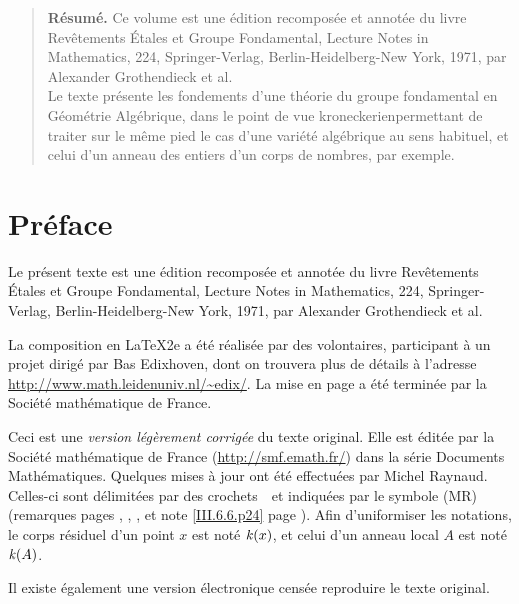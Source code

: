




\begin{quote}\textbf{Résumé.} 
Ce volume est une \'edition recompos\'ee et annot\'ee du livre \og Rev\^etements \'Etales et Groupe Fondamental\fg, Lecture Notes in Mathematics, 224, Springer-Verlag, Berlin-Heidelberg-New York, 1971, par Alexander Grothendieck et al.\\
Le texte pr\'esente les fondements d'une th\'eorie du groupe fondamental en G\'eom\'etrie Alg\'ebrique, dans le point de vue \og kroneckerien\fg permettant de traiter sur le m\^eme pied le cas d'une vari\'et\'e alg\'ebrique au sens habituel, et celui d'un anneau des entiers d'un corps de nombres, par exemple.
\end{quote}













\cleardoublepage
\renewcommand{\baselinestretch}{1.05}\normalfont
\chapter*{Pr\'eface}
\thispagestyle{empty}
\vfill
Le pr\'esent texte est une \'edition recompos\'ee
et annot\'ee
du livre \og Rev\^etements
\'Etales et Groupe Fondamental\fg, Lecture Notes in Mathematics, 224,
Springer-Verlag, Berlin-Heidelberg-New York, 1971, par Alexander
Grothendieck et al.

La composition en \LaTeX 2e a \'et\'e r\'ealis\'ee par des volontaires, participant \`a un projet dirig\'e par Bas Edixhoven, dont on trouvera plus de d\'etails \`a l'adresse \url{http://www.math.leidenuniv.nl/~edix/}. La mise en page a \'et\'e termin\'ee par la \hbox{Société} math\'ematique de France.

Ceci est une \emph{version légèrement corrigée} du texte
original. Elle est \'edit\'ee par la \hbox{Société} math\'ematique de France (\url{http://smf.emath.fr/}) dans la s\'erie \og Documents \hbox{Mathématiques}\fg. Quelques mises \`a jour ont \'et\'e effectu\'ees par Michel Raynaud. Celles-ci sont d\'elimit\'ees par des crochets \lcrochetbf\,\rcrochetbf\ et indiqu\'ees par le symbole (MR) (remarques pages \pageref{X.2.14}, \pageref{XI.1.4}, \pageref{XII.5.6}, \pageref{XIII.2.13} et note \ref{III.6.6.p24} page \pageref{III.6.6.p24}). Afin d'uniformiser les notations, le corps r\'esiduel d'un point  $x$  est not\'e  $\mathit{k}(x)$,
et celui d'un anneau local  $A$  est not\'e  $\mathit{k}(A)$.\par
Il existe \'egalement une version \'electronique cens\'ee reproduire le texte original.

